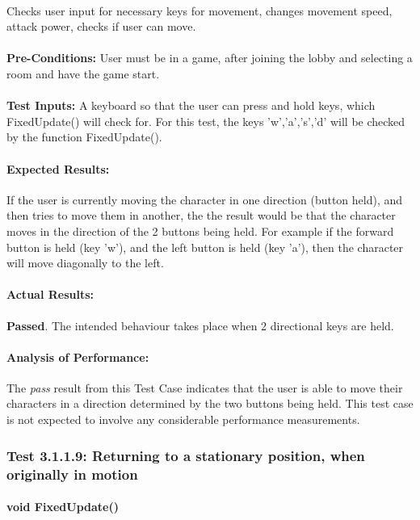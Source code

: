 \documentclass{article}
\begin{document}
    \paragraph{} Checks user input for necessary keys for movement, changes movement speed, attack power, checks if user can move.
    \paragraph{}\textbf{Pre-Conditions:} User must be in a game, after joining the lobby and selecting a room and have the game start.
    \paragraph{}\textbf{Test Inputs:} A keyboard so that the user can press and hold keys, which FixedUpdate() will check for. For this test, the keys 'w','a','s','d' will be checked by the function FixedUpdate(). 
    \paragraph{Expected Results:} If the user is currently moving the character in one direction (button held), and then tries to move them in another, the the result would be that the character moves in the direction of the 2 buttons being held. For example if the forward button is held (key 'w'), and the left button is held (key 'a'), then the character will move diagonally to the left.  
    \paragraph{Actual Results:} \textbf{Passed}. The intended behaviour takes place when 2 directional keys are held.
    \paragraph{Analysis of Performance:} The \emph{pass} result from this Test Case indicates that the user is able to move their characters in a direction determined by the two buttons being held. This test case is not expected to involve any considerable performance measurements.
    
    \subsubsection{Test 3.1.1.9: Returning to a stationary position, when originally in motion}
    \paragraph{}\textbf{void FixedUpdate()}
\end{document}

